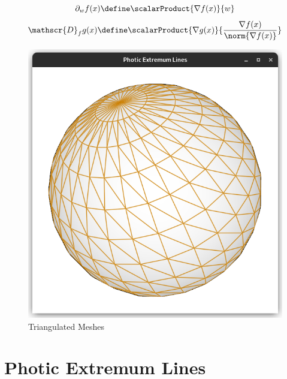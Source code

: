 \documentclass[9pt,fleqn,twoside,twocolumn]{stdglobal}
\begin{document}
  \begin{definition}
    \[
      \partial_w f(x) \define \scalarProduct{\nabla f(x)}{w}
    \]
    \[
      \mathscr{D}_f g(x) \define \scalarProduct{\nabla g(x)}{\frac{\nabla f(x)}{\norm{\nabla f(x)}}}
    \]
  \end{definition}

  \begin{figure}
    \centering
    \includegraphics[width=0.6\linewidth,trim={15px 15 15 50},clip]{images/sphere-wireframe.png}
    \caption{Triangulated Meshes}
  \end{figure}

\section{Photic Extremum Lines}
\end{document}

